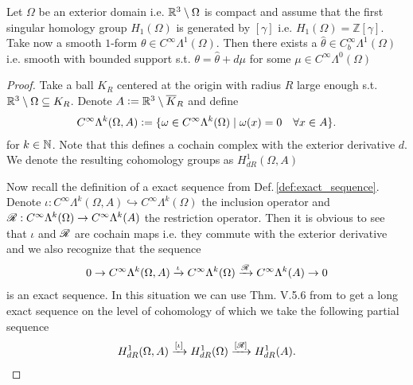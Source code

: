 \documentclass[../master_thesis.tex]{subfiles}
\begin{document}
\begin{lemma}\label{lem:1form_with_bounded_support_in_same_cohomology}
    Let $\Omega$ be an exterior domain i.e. $\mathbb{R}^3 \setminus \Omega$ is compact 
    and assume that the first singular homology 
    group $H_1(\Omega)$ is generated by $[\gamma]$ i.e. $H_1(\Omega) = \mathbb{Z} [\gamma]$.
    Take now a smooth $1$-form $\theta \in C^\infty \Lambda^1(\Omega)$.
    Then there exists a $\hat{\theta} \in C^\infty_b \Lambda^1(\Omega)$ i.e. smooth with 
    bounded support  
    s.t. $\theta = \hat{\theta} + d\mu$ for some $\mu \in C^\infty \Lambda^0(\Omega)$
\end{lemma}
\begin{proof}
    Take a ball $K_R$ centered at the origin with radius $R$ large enough s.t. 
    $\mathbb{R}^3 \setminus \Omega \subseteq K_R$. Denote 
    $A \vcentcolon= \mathbb{R}^3 \setminus \overline{K}_R$ and define 
    \begin{align*}
        C^\infty \Lambda^k(\Omega, A) 
        \vcentcolon= \{ \omega \in C^\infty \Lambda^k(\Omega) \mid \omega(x) = 0 \quad\forall x \in A \}.
    \end{align*}
    for $k \in \mathbb{N}$. Note that this defines a cochain complex with the exterior derivative $d$.
    We denote the resulting cohomology groups as $H^1_{dR}(\Omega,A)$

    Now recall the definition of a exact sequence from Def.\,\ref{def:exact_sequence}. Denote 
    $\iota: C^\infty \Lambda^k(\Omega, A) \hookrightarrow  C^\infty \Lambda^k(\Omega)$ the 
    inclusion operator and $\mathscr{R}: C^\infty \Lambda^k(\Omega) \rightarrow C^\infty \Lambda^k(A)$ 
    the restriction operator. Then it is obvious to see that 
    $\iota$ and $\mathscr{R}$ are cochain maps i.e. they commute with the exterior derivative and we also recognize that 
    the sequence 
    \begin{align*}
        0 \rightarrow C^\infty \Lambda^k(\Omega, A) \xrightarrow{\iota}
        C^\infty \Lambda^k(\Omega) \xrightarrow{\mathscr{R}} C^\infty \Lambda^k(A) \rightarrow 0
    \end{align*}
    is an exact sequence. In this situation we can use Thm. V.5.6 from \cite{topology_and_geometry}
    to get a long exact sequence on the level of cohomology of which we take the following partial 
    sequence
    \begin{align*}
        H_{dR}^1(\Omega,A) \xrightarrow{[\iota]} H_{dR}^1(\Omega) \xrightarrow{[\mathscr{R}]} H_{dR}^1(A).
    \end{align*}


\end{proof}
\end{document}
